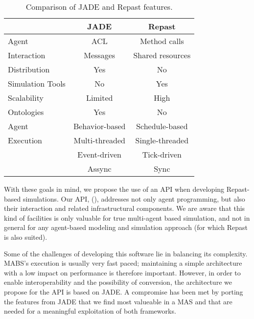 \begin{table}[h]
	\normalsize
	\caption{Comparison of JADE and Repast features.}
	\label{tab:jadevsrep}
	\begin{center}
		\begin{tabular}{l|cc}
		\hline

		\hline
		\textbf{} & \textbf{JADE} & \textbf{Repast} \\ %
		\hline
			Agent 		& ACL  	&  Method calls  \\ %
			Interaction	& Messages	&  Shared resources \\
		\hline
			Distribution & Yes & No \\ %
		\hline
			Simulation Tools & No & Yes \\ %
		\hline
			Scalability & Limited & High \\ %
		\hline
			Ontologies & Yes & No \\ %
		\hline
			Agent  		& Behavior-based & Schedule-based  \\ %
			Execution	& Multi-threaded & Single-threaded \\ %
						& Event-driven   & Tick-driven 	   \\ %
						& Assync		 & Sync 		   \\ %
		\hline
		\end{tabular}
	\end{center}
\end{table} 

With these goals in mind, we propose the use of an API when developing Repast-based simulations. Our API, \apiname{} (\apilongname{}), addresses not only agent programming, but also their interaction and related infrastructural components.
We are aware that this kind of facilities is only valuable for true multi-agent based simulation, and not in general for any agent-based modeling and simulation approach (for which Repast is also suited).

Some of the challenges of developing this software lie in balancing its complexity.
MABS's execution is usually very fast paced; maintaining a simple architecture with a low impact on performance is therefore important.
However, in order to enable interoperability and the possibility of conversion, the architecture we propose for the API is based on \gls{JADE}.
A compromise has been met by porting the features from \gls{JADE} that we find most valueable in a \gls{MAS} and that are needed for a meaningful exploitation of both frameworks.

